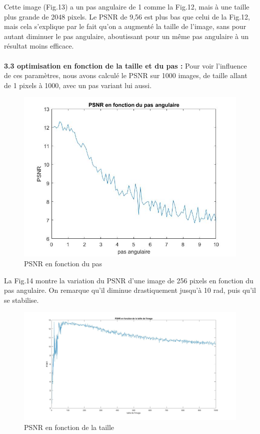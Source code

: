 \documentclass[conference]{IEEEtran}
\begin{document}
Cette image (Fig.13) a un pas angulaire de 1 comme la Fig.12, mais à une taille plus grande de 2048 pixels. Le PSNR de 9,56 est plus bas que celui de la Fig.12, mais cela s'explique par le fait qu'on a augmenté la taille de l'image, sans pour autant diminuer le pas angulaire, aboutissant pour un même pas angulaire à un résultat moins efficace.
\\
\\
\textbf{3.3 optimisation en fonction de la taille et du pas : }
Pour voir l'influence de ces paramètres, nous avons calculé le PSNR sur 1000 images, de taille allant de 1 pixels à 1000, avec un pas variant lui aussi.

\begin{figure}[H]
\centering
\includegraphics[scale=0.30]{PSNR_en_fonction_du_pas_angulaire}
	\caption[PSNR en fonction du pas]{PSNR en fonction du pas}
\label{fig:gallery}
\end{figure}

La Fig.14 montre la variation du PSNR d'une image de 256 pixels en fonction du pas angulaire. On remarque qu'il diminue drastiquement jusqu'à 10 rad, puis qu'il se stabilise.

\begin{figure}[H]
\centering
\includegraphics[scale=0.13]{PSNR3}
	\caption[PSNR en fonction de la taille]{PSNR en fonction de la taille}
\label{fig:gallery}
\end{figure}
\end{document}
